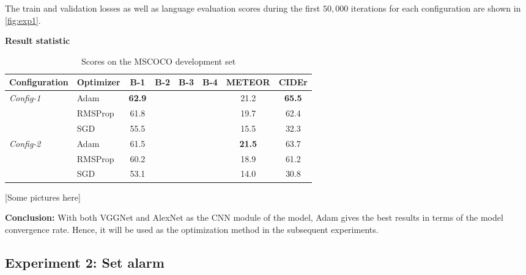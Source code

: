 The train and validation losses as well as language evaluation scores during the first $50,000$ iterations for each configuration are shown in \ref{fig:exp1}. 

\textbf{Result statistic}
\begin{table}
	\centering
	\begin{tabular}{llcccccc}
		\toprule
		Configuration & Optimizer & B-1 & B-2 & B-3 & B-4 & METEOR & CIDEr \\ \midrule
		\multirow{3}{*}{\textit{Config-1}} & Adam & \textbf{62.9} & & & & 21.2 & \textbf{65.5} \\
		 & RMSProp & 61.8 & & & & 19.7 & 62.4 \\
		 & SGD & 55.5 & & & & 15.5 & 32.3 \\
		 \midrule
		 \multirow{3}{*}{\textit{Config-2}} & Adam & 61.5 & & & &\textbf{21.5} & 63.7 \\
		 & RMSProp & 60.2 & & & & 18.9 & 61.2 \\
		 & SGD & 53.1 & & & & 14.0 & 30.8 \\
		 \bottomrule
	\end{tabular}
	\caption{Scores on the MSCOCO development set}
	\label{tab:exp1}
\end{table}

[Some pictures here]

\textbf{Conclusion:} With both VGGNet and AlexNet as the CNN module of the model, Adam gives the best results in terms of the model convergence rate. Hence, it will be used as the optimization method in the subsequent experiments.

\subsection{Experiment 2: Set alarm}
